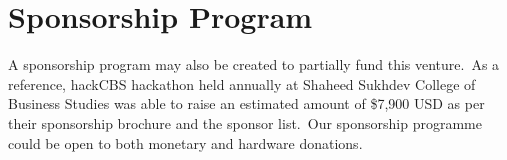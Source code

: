 

\section{Sponsorship Program}\label{sec:sponsorships}
A sponsorship program may also be created to partially fund this venture.\ As a reference, hackCBS hackathon held
annually at Shaheed Sukhdev College of Business Studies was able to raise an estimated amount of \$7,900 USD as per
their sponsorship brochure and the sponsor list.\ Our sponsorship programme could be open to both monetary and hardware
donations.
